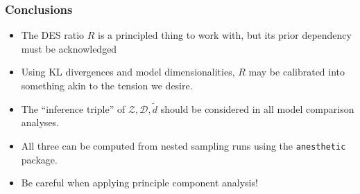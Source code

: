 \documentclass[%
]{beamer}
\begin{document}
\begin{frame}
    \frametitle{Conclusions}
    \begin{itemize}
        \item The DES ratio $R$ is a principled thing to work with, but its prior dependency must be acknowledged
        \item Using KL divergences and model dimensionalities, $R$ may be calibrated into something akin to the tension we desire.
        \item The ``inference triple'' of $\mathcal{Z},\mathcal{D},\tilde{d}$ should be considered in all model comparison analyses.
        \item All three can be computed from nested sampling runs using the \texttt{anesthetic} package.
        \item Be careful when applying principle component analysis!
    \end{itemize}
\end{frame}
\end{document}
